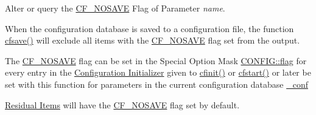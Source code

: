 Alter or query the \hyperlink{group__special__options__mask_gd76153c65f68cc0ee5c1a04c8c3e80bf}{CF\_\-NOSAVE} Flag of Parameter {\em name\/}. 

When the configuration database is saved to a configuration file, the function \hyperlink{group__setting__saving_g046d8a68eae35b987eacca04a9a06cca}{cfsave()} will exclude all items with the \hyperlink{group__special__options__mask_gd76153c65f68cc0ee5c1a04c8c3e80bf}{CF\_\-NOSAVE} flag set from the output.

The \hyperlink{group__special__options__mask_gd76153c65f68cc0ee5c1a04c8c3e80bf}{CF\_\-NOSAVE} flag can be set in the Special Option Mask \hyperlink{struct_c_o_n_f_i_g_b04d08abdf758c0400caaded716f4089}{CONFIG::flag} for every entry in the \hyperlink{config_initializer}{Configuration Initializer} given to \hyperlink{group__cflib__core_ge593ff607f853bd5fc16a16bb6759314}{cfinit()} or \hyperlink{group__cflib__core_gdcf24d678203bd09a0a3e05b8a986c65}{cfstart()} or later be set with this function for parameters in the current configuration database \hyperlink{group__cflib__core_g7d0fec33ada97c2d7ef78e6c3d83da97}{\_\-conf}

\hyperlink{config_levels_residuals}{Residual Items} will have the \hyperlink{group__special__options__mask_gd76153c65f68cc0ee5c1a04c8c3e80bf}{CF\_\-NOSAVE} flag set by default.

